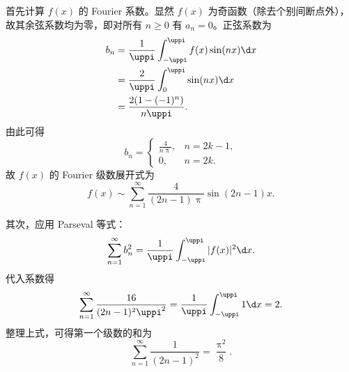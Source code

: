 \begin{solution}
    首先计算 $f(x)$ 的 Fourier 系数。显然 $f(x)$ 为奇函数（除去个别间断点外），故其余弦系数均为零，即对所有 $n \geqslant 0$ 有 $a_n = 0$。正弦系数为
    \begin{equation}\label{eq:fourier-coeff-3}
        \begin{aligned}
            b_n & = \frac{1}{\uppi} \int_{-\uppi}^{\uppi} f(x) \sin(nx) \d x \\
                & = \frac{2}{\uppi} \int_{0}^{\uppi} \sin(nx) \d x           \\
                & = \frac{2(1 - (-1)^n)}{n\uppi}.
        \end{aligned}
    \end{equation}
    由此可得
    \begin{equation}\label{eq:bn-cases-3}
        b_n = \begin{cases} \frac{4}{n\uppi}, & n = 2k-1, \\ 0, & n = 2k. \end{cases}
    \end{equation}
    故 $f(x)$ 的 Fourier 级数展开式为
    \begin{equation}
        \boxed{f(x) \sim \sum_{n=1}^{\infty} \frac{4}{(2n-1)\uppi} \sin(2n-1)x}.
    \end{equation}

    其次，应用 Parseval 等式：
    \begin{equation}\label{eq:parseval-3}
        \sum_{n=1}^{\infty} b_n^2 = \frac{1}{\uppi} \int_{-\uppi}^{\uppi} |f(x)|^2 \d x.
    \end{equation}
    代入系数得
    \begin{equation}\label{eq:parseval-calc-3}
        \sum_{n=1}^{\infty} \frac{16}{(2n-1)^2\uppi^2} = \frac{1}{\uppi} \int_{-\uppi}^{\uppi} 1 \d x = 2.
    \end{equation}
    整理上式，可得第一个级数的和为
    \begin{equation}
        \boxed{\sum_{n=1}^{\infty} \frac{1}{(2n-1)^2} = \frac{\uppi^2}{8}}.
    \end{equation}


\end{solution}

